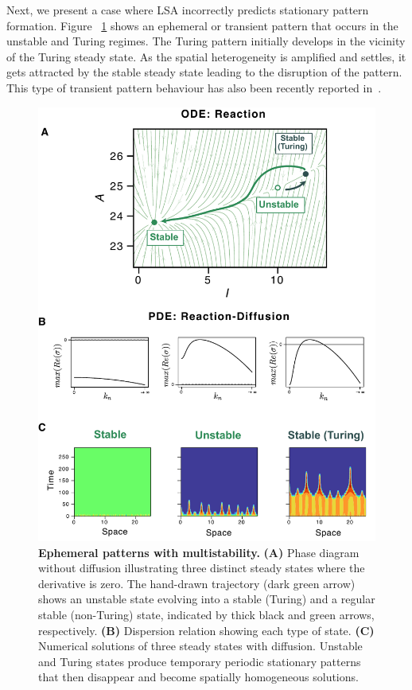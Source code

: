 Next, we present a case where LSA incorrectly predicts stationary pattern formation.
Figure ~\ref{fig:multistability2} shows an ephemeral or transient pattern that occurs in the unstable and Turing regimes.
The Turing pattern initially develops in the vicinity of the Turing steady state.
As the spatial heterogeneity is amplified and settles, it gets attracted by the stable steady state leading to the disruption of the pattern.
This type of transient pattern behaviour has also been recently reported in~\cite{Krause2023}.

\begin{figure}[H]
        \includegraphics[width=1\textwidth]{figures/multistability2} %
    \caption{\textbf{Ephemeral patterns with multistability.} \textbf{(A)} Phase diagram without diffusion illustrating three distinct steady states where the derivative is zero. The hand-drawn trajectory (dark green arrow) shows an unstable state evolving into a stable (Turing) and a regular stable (non-Turing) state, indicated by thick black and green arrows, respectively. \textbf{(B)} Dispersion relation showing each type of state. \textbf{(C)} Numerical solutions of three steady states with diffusion. Unstable and Turing states produce temporary periodic stationary patterns that then disappear and become spatially homogeneous solutions.}
    \label{fig:multistability2} %
\end{figure}

